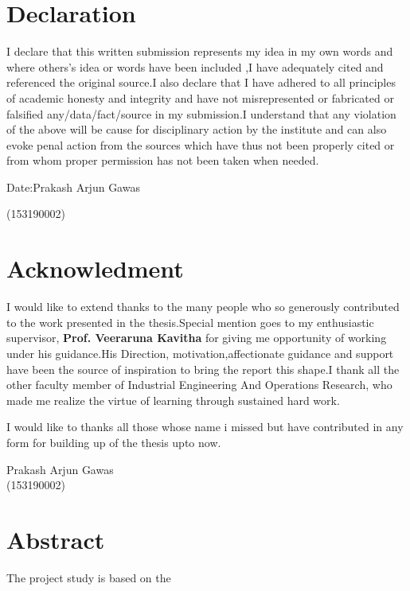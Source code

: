 \documentclass[12pt,a4paper,oneside]{report}
\date{}
\begin{document}

\chapter*{Declaration}
I declare that this written submission represents my idea in my own words and where others's idea or words have been included ,I have adequately cited and referenced the original source.I also declare that I have adhered to all principles of academic honesty and integrity and have not misrepresented or fabricated or falsified any/data/fact/source in my submission.I understand that any violation of the above will be cause for disciplinary action by the institute and can also evoke penal action from the sources which have thus not been properly cited or from whom proper permission has not been taken when needed.
\vspace{1cm}


\noindent Date:\hfill Prakash Arjun Gawas                     
\begin{flushright}(153190002)\end{flushright}
\chapter*{Acknowledment}
I would like to extend thanks to the many people who so generously contributed to the work presented in the thesis.Special mention goes to my enthusiastic supervisor, \textbf{Prof. Veeraruna Kavitha} for giving me opportunity of working under his guidance.His Direction, motivation,affectionate guidance and support have been the source of inspiration to bring the report this shape.I thank all the other faculty member of Industrial Engineering And Operations Research, who made me realize the virtue of learning through sustained hard work.
\vspace{6mm}

\noindent I would like to thanks all those whose name i missed but have contributed in any form for building up of the thesis upto now.
\vspace{1cm}

\begin{flushright}
Prakash Arjun Gawas\\
(153190002)
\end{flushright}

\chapter*{Abstract}
The project study is based on the
\tableofcontents
\listoffigures
\listoftables
\end{document}
